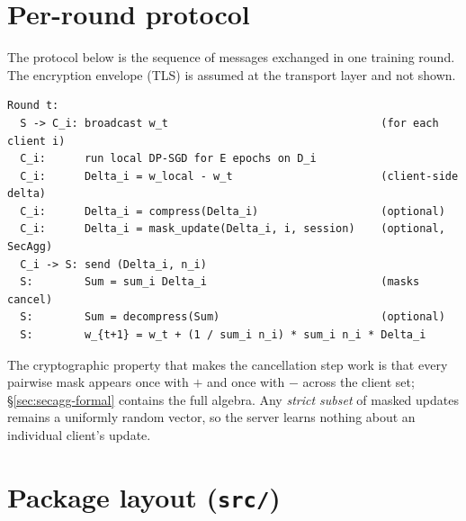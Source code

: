 \documentclass[11pt,a4paper]{report}
\begin{document}
\section{Per-round protocol}

The protocol below is the sequence of messages exchanged in one
training round. The encryption envelope (TLS) is assumed at the
transport layer and not shown.

\begin{verbatim}
Round t:
  S -> C_i: broadcast w_t                                 (for each client i)
  C_i:      run local DP-SGD for E epochs on D_i
  C_i:      Delta_i = w_local - w_t                       (client-side delta)
  C_i:      Delta_i = compress(Delta_i)                   (optional)
  C_i:      Delta_i = mask_update(Delta_i, i, session)    (optional, SecAgg)
  C_i -> S: send (Delta_i, n_i)
  S:        Sum = sum_i Delta_i                           (masks cancel)
  S:        Sum = decompress(Sum)                         (optional)
  S:        w_{t+1} = w_t + (1 / sum_i n_i) * sum_i n_i * Delta_i
\end{verbatim}

The cryptographic property that makes the cancellation step work is
that every pairwise mask appears once with $+$ and once with $-$
across the client set; \S\ref{sec:secagg-formal} contains the full
algebra. Any \emph{strict subset} of masked updates remains a uniformly
random vector, so the server learns nothing about an individual
client's update.

\section{Package layout (\texttt{src/})}
\end{document}
